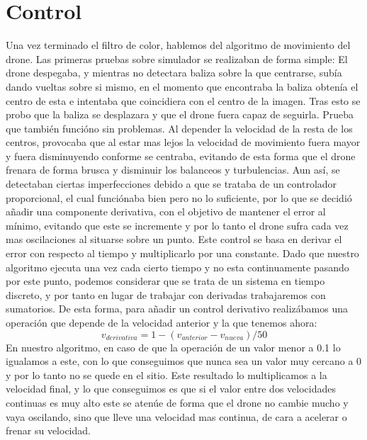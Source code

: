 \section{Control}
\hspace{1cm} Una vez terminado el filtro de color, hablemos del algoritmo de movimiento del drone. Las primeras pruebas sobre simulador se realizaban de forma simple: El drone despegaba, y mientras no detectara baliza sobre la que centrarse, sub\'ia dando vueltas sobre si mismo, en el momento que encontraba la baliza obten\'ia el centro de esta e intentaba que coincidiera con el centro de la imagen. Tras esto se probo que la baliza se desplazara y que el drone fuera capaz de seguirla. Prueba que tambi\'en funci\'ono sin problemas. Al depender la velocidad de la resta de los centros, provocaba que al estar mas lejos la velocidad de movimiento fuera mayor y fuera disminuyendo conforme se centraba, evitando de esta forma que el drone frenara de forma brusca y disminuir los balanceos y turbulencias. 
Aun as\'i, se detectaban ciertas imperfecciones debido a que se trataba de un controlador proporcional, el cual funci\'onaba bien pero no lo suficiente, por lo que se decidi\'o añadir una componente derivativa, con el objetivo de mantener el error al m\'inimo, evitando que este se incremente y por lo tanto el drone sufra cada vez mas oscilaciones al situarse sobre un punto. Este control se basa en derivar el error con respecto al tiempo y multiplicarlo por una constante. Dado que nuestro algoritmo ejecuta una vez cada cierto tiempo y no esta continuamente pasando por este punto, podemos considerar que se trata de un sistema en tiempo discreto, y por tanto en lugar de trabajar con derivadas trabajaremos con sumatorios. De esta forma, para añadir un control derivativo realiz\'abamos una operaci\'on que depende de la velocidad anterior y la que tenemos ahora: \[v_{derivativa} =1-(v_{anterior}-v_{nueva})/50 \]  
\hspace{1cm} En nuestro algoritmo, en caso de que la operaci\'on de un valor menor a 0.1 lo igualamos a este, con lo que conseguimos que nunca sea un valor muy cercano a 0 y por lo tanto no se quede en el sitio. Este resultado lo multiplicamos a la velocidad final, y lo que conseguimos es que si el valor entre dos velocidades continuas es muy alto este se aten\'ue de forma que el drone no cambie mucho y vaya oscilando, sino que lleve una velocidad mas continua, de cara a acelerar o frenar su velocidad. 

